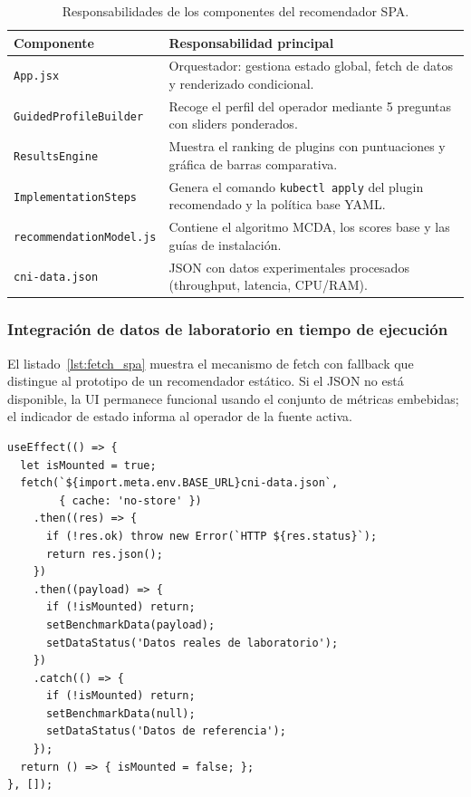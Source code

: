 \begin{table}[h]
\centering
\caption{Responsabilidades de los componentes del recomendador SPA.}
\label{tab:oe4_componentes}
\small
\begin{tabularx}{\linewidth}{lY}
\toprule
\textbf{Componente} & \textbf{Responsabilidad principal} \\
\midrule
\texttt{App.jsx}
  & Orquestador: gestiona estado global, fetch de datos y renderizado condicional. \\
\texttt{GuidedProfileBuilder}
  & Recoge el perfil del operador mediante 5 preguntas con sliders ponderados. \\
\texttt{ResultsEngine}
  & Muestra el ranking de plugins con puntuaciones y gráfica de barras comparativa. \\
\texttt{ImplementationSteps}
  & Genera el comando \texttt{kubectl apply} del plugin recomendado y la política base YAML. \\
\texttt{recommendationModel.js}
  & Contiene el algoritmo MCDA, los scores base y las guías de instalación. \\
\texttt{cni-data.json}
  & JSON con datos experimentales procesados (throughput, latencia, CPU/RAM). \\
\bottomrule
\end{tabularx}
\end{table}

\subsubsection*{Integración de datos de laboratorio en tiempo de ejecución}

El listado~\ref{lst:fetch_spa} muestra el mecanismo de fetch con
fallback que distingue al prototipo de un recomendador estático.
Si el JSON no está disponible, la UI permanece funcional usando el
conjunto de métricas embebidas; el indicador de estado informa al
operador de la fuente activa.

\begin{lstlisting}[caption={Fetch de datos de laboratorio con fallback embebido (\texttt{App.jsx}).}, label={lst:fetch_spa}]
useEffect(() => {
  let isMounted = true;
  fetch(`${import.meta.env.BASE_URL}cni-data.json`,
        { cache: 'no-store' })
    .then((res) => {
      if (!res.ok) throw new Error(`HTTP ${res.status}`);
      return res.json();
    })
    .then((payload) => {
      if (!isMounted) return;
      setBenchmarkData(payload);
      setDataStatus('Datos reales de laboratorio');
    })
    .catch(() => {
      if (!isMounted) return;
      setBenchmarkData(null);
      setDataStatus('Datos de referencia');
    });
  return () => { isMounted = false; };
}, []);
\end{lstlisting}

